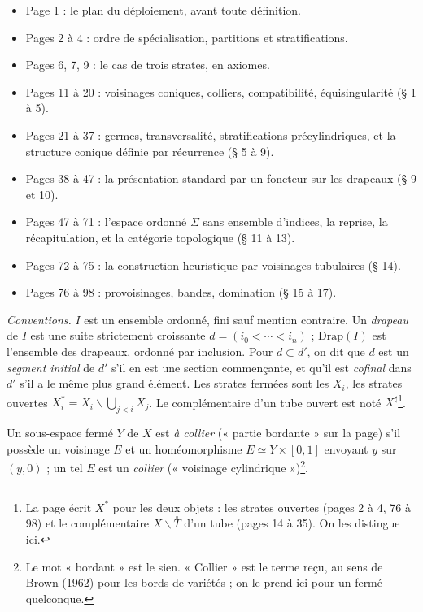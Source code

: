 \documentclass[11pt,a4paper]{article}
\begin{document}
\begin{itemize}
\item Page 1 : le plan du déploiement, avant toute définition.
\item Pages 2 à 4 : ordre de spécialisation, partitions et stratifications.
\item Pages 6, 7, 9 : le cas de trois strates, en axiomes.
\item Pages 11 à 20 : voisinages coniques, colliers, compatibilité,
équisingularité (§ 1 à 5).
\item Pages 21 à 37 : germes, transversalité, stratifications précylindriques,
et la structure conique définie par récurrence (§ 5 à 9).
\item Pages 38 à 47 : la présentation standard par un foncteur sur les drapeaux
(§ 9 et 10).
\item Pages 47 à 71 : l'espace ordonné $\Sigma$ sans ensemble d'indices, la
reprise, la récapitulation, et la catégorie topologique (§ 11 à 13).
\item Pages 72 à 75 : la construction heuristique par voisinages tubulaires (§ 14).
\item Pages 76 à 98 : provoisinages, bandes, domination (§ 15 à 17).
\end{itemize}

\emph{Conventions.} $I$ est un ensemble ordonné, fini sauf mention contraire. Un
\emph{drapeau} de $I$ est une suite strictement croissante $d = (i_0 < \cdots <
i_n)$ ; $\mathrm{Drap}(I)$ est l'ensemble des drapeaux, ordonné par inclusion.
Pour $d \subset d'$, on dit que $d$ est un \emph{segment initial} de $d'$ s'il en
est une section commençante, et qu'il est \emph{cofinal} dans $d'$ s'il a le même
plus grand élément. Les strates fermées sont les $X_i$, les strates ouvertes
$X^{*}_i = X_i \smallsetminus \bigcup_{j<i} X_j$. Le complémentaire d'un tube
ouvert est noté $X^{\sharp}$\footnote{La page écrit $X^{*}$ pour les deux objets :
les strates ouvertes (pages 2 à 4, 76 à 98) et le complémentaire $X \smallsetminus
\overset{\circ}{T}$ d'un tube (pages 14 à 35). On les distingue ici.}.

Un sous-espace fermé $Y$ de $X$ est \emph{à collier} (« partie bordante » sur la
page) s'il possède un voisinage $E$ et un homéomorphisme $E \simeq Y \times
[0,1]$ envoyant $y$ sur $(y,0)$ ; un tel $E$ est un \emph{collier} (« voisinage
cylindrique »)\footnote{Le mot « bordant » est le sien. « Collier » est le terme
reçu, au sens de Brown (1962) pour les bords de variétés ; on le prend ici pour
un fermé quelconque.}.
\end{document}
